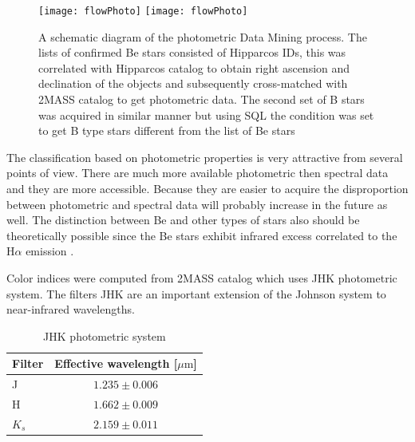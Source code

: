    \begin{figure}[!htbp]
      \begin{center}
        \leavevmode
        \ifpdf
        \texttt{[image: flowPhoto]}
        \else
        \texttt{[image: flowPhoto]}
        \fi
        \caption{A schematic diagram of the photometric Data Mining
          process. The lists of confirmed Be stars consisted of
          Hipparcos IDs, this was correlated with Hipparcos catalog to
          obtain right ascension and declination of the objects and
          subsequently cross-matched with 2MASS catalog to get
          photometric data. The second set of B stars was acquired in
          similar manner but using SQL the condition was set to get B
          type stars different from the list of Be stars}
        \label{FigFlowSpectra}
      \end{center}
    \end{figure}

 



    The classification based on photometric properties is very
    attractive from several points of view. There are much more
    available photometric then spectral data and they are more
    accessible. Because they are easier to acquire the disproportion
    between photometric and spectral data will probably increase in
    the future as well. The distinction between Be and other types of
    stars also should be theoretically possible since the Be stars
    exhibit infrared excess correlated to the H$\alpha$ emission
    \citep{van1995halpha}.

Color indices were computed from 2MASS catalog which uses JHK
photometric system. The filters JHK are an important extension of the
Johnson system to near-infrared wavelengths.

\begin{table}[ht]
  \centering
  \small
     \begin{tabular}[ht]{l c}
     \toprule
     Filter & Effective wavelength [$\mu\textrm{m}$] \\
     \midrule
     J & $1.235 \pm 0.006$ \\
     H & $1.662 \pm 0.009$ \\
     $K_s$ & $2.159 \pm 0.011$ \\
     \bottomrule
   \end{tabular}
   \caption{JHK photometric system \citep{cohen2003spectral}}
  \label{tab:JHKFilter}
\end{table}



